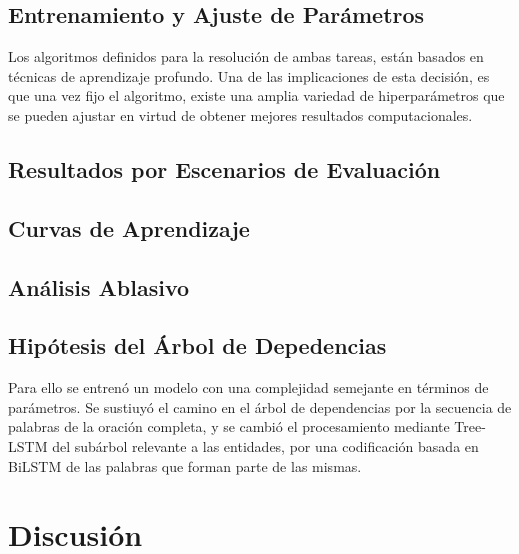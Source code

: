 \subsection{Entrenamiento y Ajuste de Parámetros}

Los algoritmos definidos para la resolución de ambas tareas, están basados en técnicas de aprendizaje profundo.
Una de las implicaciones de esta decisión, es que una vez fijo el algoritmo, existe una amplia variedad de hiperparámetros que se pueden ajustar en virtud de obtener mejores resultados computacionales.

\subsection{Resultados por Escenarios de Evaluación}

\subsection{Curvas de Aprendizaje}

\subsection{Análisis Ablasivo}

\subsection{Hipótesis del Árbol de Depedencias}

Para ello se entrenó un modelo con una complejidad semejante en términos de parámetros.
Se sustiuyó el camino en el árbol de dependencias por la secuencia de palabras de la oración completa, y se cambió el procesamiento mediante Tree-LSTM del subárbol relevante a las entidades, por una codificación basada en BiLSTM de las palabras que forman parte de las mismas.


\section{Discusión}
